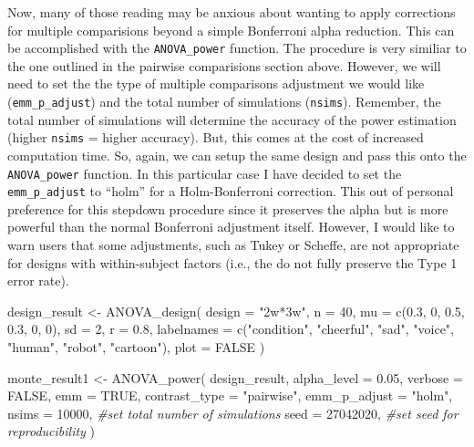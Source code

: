 \documentclass[
]{book}
\newenvironment{Shaded}{\begin{snugshade}}{\end{snugshade}}
\newcommand{\AttributeTok}[1]{\textcolor[rgb]{0.77,0.63,0.00}{#1}}
\newcommand{\CommentTok}[1]{\textcolor[rgb]{0.56,0.35,0.01}{\textit{#1}}}
\newcommand{\ConstantTok}[1]{\textcolor[rgb]{0.00,0.00,0.00}{#1}}
\newcommand{\DecValTok}[1]{\textcolor[rgb]{0.00,0.00,0.81}{#1}}
\newcommand{\FloatTok}[1]{\textcolor[rgb]{0.00,0.00,0.81}{#1}}
\newcommand{\FunctionTok}[1]{\textcolor[rgb]{0.00,0.00,0.00}{#1}}
\newcommand{\NormalTok}[1]{#1}
\newcommand{\OtherTok}[1]{\textcolor[rgb]{0.56,0.35,0.01}{#1}}
\newcommand{\StringTok}[1]{\textcolor[rgb]{0.31,0.60,0.02}{#1}}
\begin{document}
Now, many of those reading may be anxious about wanting to apply corrections for multiple comparisions beyond a simple Bonferroni alpha reduction. This can be accomplished with the \texttt{ANOVA\_power} function. The procedure is very similiar to the one outlined in the pairwise comparisions section above.
However, we will need to set the the type of multiple comparisons adjustment we would like (\texttt{emm\_p\_adjust}) and the total number of simulations (\texttt{nsims}).
Remember, the total number of simulations will determine the accuracy of the power estimation (higher \texttt{nsims} = higher accuracy).
But, this comes at the cost of increased computation time.
So, again, we can setup the same design and pass this onto the \texttt{ANOVA\_power} function.
In this particular case I have decided to set the \texttt{emm\_p\_adjust} to ``holm'' for a Holm-Bonferroni correction.
This out of personal preference for this stepdown procedure since it preserves the alpha but is more powerful than the normal Bonferroni adjustment itself.
However, I would like to warn users that some adjustments, such as Tukey or Scheffe, are not appropriate for designs with within-subject factors (i.e., the do not fully preserve the Type 1 error rate).

\begin{Shaded}
\begin{Highlighting}[]
\NormalTok{design\_result }\OtherTok{\textless{}{-}} \FunctionTok{ANOVA\_design}\NormalTok{(}
  \AttributeTok{design =} \StringTok{"2w*3w"}\NormalTok{,}
  \AttributeTok{n =} \DecValTok{40}\NormalTok{,}
  \AttributeTok{mu =} \FunctionTok{c}\NormalTok{(}\FloatTok{0.3}\NormalTok{, }\DecValTok{0}\NormalTok{, }\FloatTok{0.5}\NormalTok{, }\FloatTok{0.3}\NormalTok{, }\DecValTok{0}\NormalTok{, }\DecValTok{0}\NormalTok{),}
  \AttributeTok{sd =} \DecValTok{2}\NormalTok{,}
  \AttributeTok{r =} \FloatTok{0.8}\NormalTok{, }
  \AttributeTok{labelnames =} \FunctionTok{c}\NormalTok{(}\StringTok{"condition"}\NormalTok{, }\StringTok{"cheerful"}\NormalTok{, }\StringTok{"sad"}\NormalTok{, }\StringTok{"voice"}\NormalTok{, }\StringTok{"human"}\NormalTok{, }\StringTok{"robot"}\NormalTok{, }\StringTok{"cartoon"}\NormalTok{),}
  \AttributeTok{plot =} \ConstantTok{FALSE}
\NormalTok{)}

\NormalTok{monte\_result1 }\OtherTok{\textless{}{-}} \FunctionTok{ANOVA\_power}\NormalTok{(}
\NormalTok{  design\_result,}
  \AttributeTok{alpha\_level =} \FloatTok{0.05}\NormalTok{,}
  \AttributeTok{verbose =} \ConstantTok{FALSE}\NormalTok{,}
  \AttributeTok{emm =} \ConstantTok{TRUE}\NormalTok{,}
  \AttributeTok{contrast\_type =} \StringTok{"pairwise"}\NormalTok{,}
  \AttributeTok{emm\_p\_adjust =} \StringTok{"holm"}\NormalTok{,}
  \AttributeTok{nsims =} \DecValTok{10000}\NormalTok{, }\CommentTok{\#set total number of simulations}
  \AttributeTok{seed =} \DecValTok{27042020}\NormalTok{, }\CommentTok{\#set seed for reproducibility}
\NormalTok{)}
\end{Highlighting}
\end{Shaded}
\end{document}
